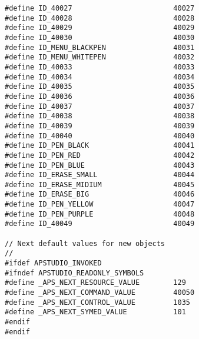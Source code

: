 \begin{lstlisting}[caption=resource.h]
#define ID_40027                        40027
#define ID_40028                        40028
#define ID_40029                        40029
#define ID_40030                        40030
#define ID_MENU_BLACKPEN                40031
#define ID_MENU_WHITEPEN                40032
#define ID_40033                        40033
#define ID_40034                        40034
#define ID_40035                        40035
#define ID_40036                        40036
#define ID_40037                        40037
#define ID_40038                        40038
#define ID_40039                        40039
#define ID_40040                        40040
#define ID_PEN_BLACK                    40041
#define ID_PEN_RED                      40042
#define ID_PEN_BLUE                     40043
#define ID_ERASE_SMALL                  40044
#define ID_ERASE_MIDIUM                 40045
#define ID_ERASE_BIG                    40046
#define ID_PEN_YELLOW                   40047
#define ID_PEN_PURPLE                   40048
#define ID_40049                        40049

// Next default values for new objects
// 
#ifdef APSTUDIO_INVOKED
#ifndef APSTUDIO_READONLY_SYMBOLS
#define _APS_NEXT_RESOURCE_VALUE        129
#define _APS_NEXT_COMMAND_VALUE         40050
#define _APS_NEXT_CONTROL_VALUE         1035
#define _APS_NEXT_SYMED_VALUE           101
#endif
#endif
\end{lstlisting}


